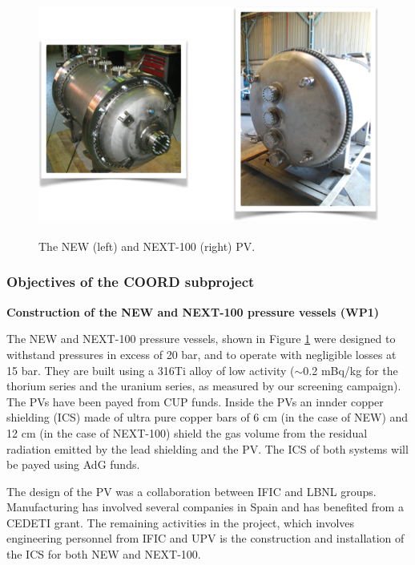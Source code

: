 %
%

\begin{figure}
\centering
\includegraphics[height=8cm]{img/PV.png}
\caption{The NEW (left) and NEXT-100 (right) PV.} \label{fig:PV}
\end{figure}


\subsubsection*{Objectives of the COORD subproject}

{\bf Construction of the NEW and NEXT-100 pressure vessels (WP1)}

The NEW and NEXT-100 pressure vessels, shown in Figure \ref{fig:PV} were designed to withstand pressures in excess of 20 bar, and to operate with negligible losses at 15 bar. They are built using a 316Ti alloy of low activity ($\sim$0.2 mBq/kg for the thorium series and 
the uranium series, as measured by our screening campaign). The PVs have been payed from CUP funds. Inside the PVs an innder copper shielding (ICS) made of ultra pure copper bars of 6 cm (in the case of NEW) and 12 cm (in the case of NEXT-100) shield the gas volume from the residual radiation emitted by the lead shielding and the PV. The ICS of both systems will be payed using AdG funds. 

The design of the PV was a collaboration between IFIC and LBNL groups. Manufacturing has involved several companies in Spain and has benefited from a CEDETI grant. The remaining activities in the project, which involves engineering personnel from IFIC and UPV is the construction and installation of the ICS for both NEW and NEXT-100. 

